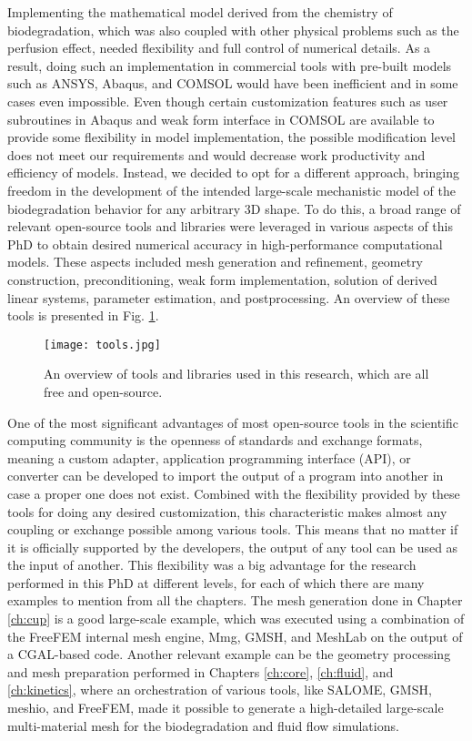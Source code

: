 Implementing the mathematical model derived from the chemistry of biodegradation, which was also coupled with other physical problems such as the perfusion effect, needed flexibility and full control of numerical details. As a result, doing such an implementation in commercial tools with pre-built models such as ANSYS, Abaqus, and COMSOL would have been inefficient and in some cases even impossible. Even though certain customization features such as user subroutines in Abaqus and weak form interface in COMSOL are available to provide some flexibility in model implementation, the possible modification level does not meet our requirements and would decrease work productivity and efficiency of models. Instead, we decided to opt for a different approach, bringing freedom in the development of the intended large-scale mechanistic model of the biodegradation behavior for any arbitrary 3D shape. To do this, a broad range of relevant open-source tools and libraries were leveraged in various aspects of this PhD to obtain desired numerical accuracy in high-performance computational models. These aspects included mesh generation and refinement, geometry construction, preconditioning, weak form implementation, solution of derived linear systems, parameter estimation, and postprocessing. An overview of these tools is presented in Fig. \ref{fig:conclusion_tools}.

\begin{figure}[h]
\centering
\medskip
\texttt{[image: tools.jpg]}
\caption[Overview of open-source tools and libraries used in this PhD]{An overview of tools and libraries used in this research, which are all free and open-source.} \label{fig:conclusion_tools}
\end{figure}


One of the most significant advantages of most open-source tools in the scientific computing community is the openness of standards and exchange formats, meaning a custom adapter, application programming interface (\gls{API}), or converter can be developed to import the output of a program into another in case a proper one does not exist. Combined with the flexibility provided by these tools for doing any desired customization, this characteristic makes almost any coupling or exchange possible among various tools. This means that no matter if it is officially supported by the developers, the output of any tool can be used as the input of another. This flexibility was a big advantage for the research performed in this PhD at different levels, for each of which there are many examples to mention from all the chapters. The mesh generation done in Chapter \ref{ch:cup} is a good large-scale example, which was executed using a combination of the FreeFEM internal mesh engine, Mmg, GMSH, and MeshLab on the output of a CGAL-based code. Another relevant example can be the geometry processing and mesh preparation performed in Chapters \ref{ch:core}, \ref{ch:fluid}, and \ref{ch:kinetics}, where an orchestration of various tools, like SALOME, GMSH, meshio, and FreeFEM, made it possible to generate a high-detailed large-scale multi-material mesh for the biodegradation and fluid flow simulations.


